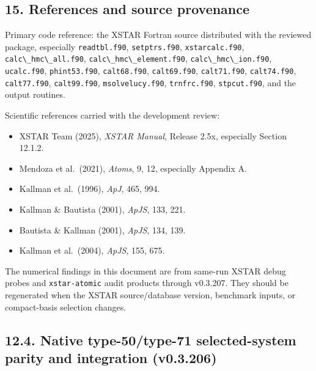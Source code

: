\documentclass[
  10pt,
]{article}
\newcommand{\passthrough}[1]{#1}
\providecommand{\tightlist}{%
  \setlength{\itemsep}{0pt}\setlength{\parskip}{0pt}}
\begin{document}
\subsection{15. References and source
provenance}\label{references-and-source-provenance}

Primary code reference: the XSTAR Fortran source distributed with the
reviewed package, especially \passthrough{\lstinline!readtbl.f90!},
\passthrough{\lstinline!setptrs.f90!},
\passthrough{\lstinline!xstarcalc.f90!},
\passthrough{\lstinline!calc\_hmc\_all.f90!},
\passthrough{\lstinline!calc\_hmc\_element.f90!},
\passthrough{\lstinline!calc\_hmc\_ion.f90!},
\passthrough{\lstinline!ucalc.f90!},
\passthrough{\lstinline!phint53.f90!},
\passthrough{\lstinline!calt68.f90!},
\passthrough{\lstinline!calt69.f90!},
\passthrough{\lstinline!calt71.f90!},
\passthrough{\lstinline!calt74.f90!},
\passthrough{\lstinline!calt77.f90!},
\passthrough{\lstinline!calt99.f90!},
\passthrough{\lstinline!msolvelucy.f90!},
\passthrough{\lstinline!trnfrc.f90!},
\passthrough{\lstinline!stpcut.f90!}, and the output routines.

Scientific references carried with the development review:

\begin{itemize}
\tightlist
\item
  XSTAR Team (2025), \emph{XSTAR Manual}, Release 2.5x, especially Section 12.1.2.
\item
  Mendoza et al.~(2021), \emph{Atoms}, 9, 12, especially Appendix A.
\item
  Kallman et al.~(1996), \emph{ApJ}, 465, 994.
\item
  Kallman \& Bautista (2001), \emph{ApJS}, 133, 221.
\item
  Bautista \& Kallman (2001), \emph{ApJS}, 134, 139.
\item
  Kallman et al.~(2004), \emph{ApJS}, 155, 675.
\end{itemize}

The numerical findings in this document are from same-run XSTAR debug
probes and \passthrough{\lstinline!xstar-atomic!} audit products through
v0.3.207. They should be regenerated when the XSTAR source/database
version, benchmark inputs, or compact-basis selection changes.


\subsection{12.4. Native type-50/type-71 selected-system parity and integration (v0.3.206)}
\end{document}
